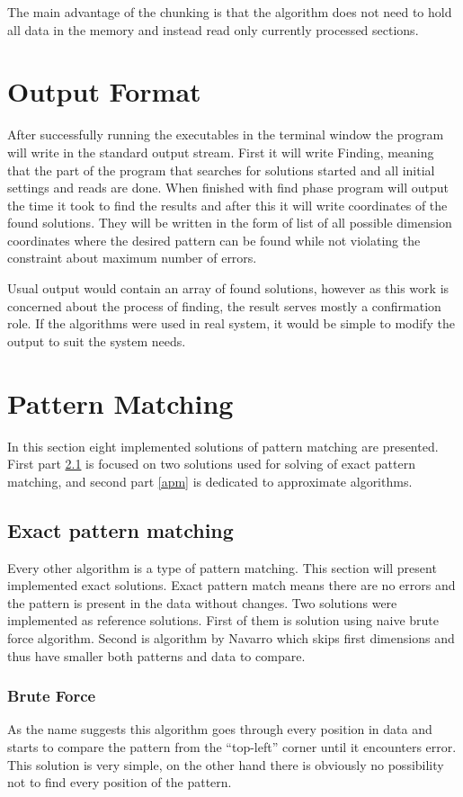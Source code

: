 The main advantage of the chunking is that the algorithm does not need to hold all data in the memory and instead read only currently processed sections.

\section{Output Format}
After successfully running the executables in the terminal window the program will write in the standard output stream. First it will write Finding, meaning that the part of the program that searches for solutions started and all initial settings and reads are done. When finished with find phase program will output the time it took to find the results and after this it will write coordinates of the found solutions. They will be written in the form of list of all possible dimension coordinates where the desired pattern can be found while not violating the constraint about maximum number of errors.

Usual output would contain an array of found solutions, however as this work is concerned about the process of finding, the result serves mostly a confirmation role. If the algorithms were used in real system, it would be simple to modify the output to suit the system needs.

\section{Pattern Matching}
In this section eight implemented solutions of pattern matching are presented. First part \ref{epm} is focused on two solutions used for solving of exact pattern matching, and second part \ref{apm} is dedicated to approximate algorithms.

\subsection{Exact pattern matching}\label{epm}
Every other algorithm is a type of pattern matching. This section will present implemented exact solutions. Exact pattern match means there are no errors and the pattern is present in the data without changes. Two solutions were implemented as reference solutions. First of them is solution using naive brute force algorithm. Second is algorithm by Navarro which skips first dimensions and thus have smaller both patterns and data to compare.

\subsubsection{Brute Force} \label{bruteepm}
As the name suggests this algorithm goes through every position in data and starts to compare the pattern from the ``top-left'' corner until it encounters error. This solution is very simple, on the other hand there is obviously no possibility not to find every position of the pattern.

